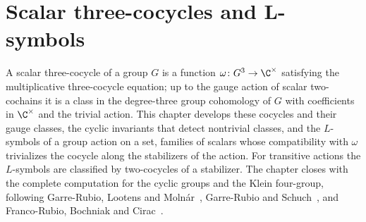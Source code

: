 \chapter{Scalar three-cocycles and L-symbols}
\label{ch:threecocycle}

A scalar three-cocycle of a group $G$ is a function
$\omega\colon G^3\to\C^\times$ satisfying the multiplicative three-cocycle
equation; up to the gauge action of scalar two-cochains it is a class in the
degree-three group cohomology of $G$ with coefficients in $\C^\times$ and the
trivial action. This chapter develops these cocycles and their gauge classes,
the cyclic invariants that detect nontrivial classes, and the
$L$-symbols of a group action on a set, families of scalars whose
compatibility with $\omega$ trivializes the cocycle along the stabilizers of
the action. For transitive actions the $L$-symbols are classified by
two-cocycles of a stabilizer. The chapter closes with the complete
computation for the cyclic groups and the Klein four-group, following
Garre-Rubio, Lootens and Moln\'ar~\cite{GarreRubio2023MPOSym}, Garre-Rubio
and Schuch~\cite{GarreRubioSchuch2024DomainWall}, and Franco-Rubio,
Bochniak and Cirac~\cite{FrancoRubio2025MPUGauging}.





